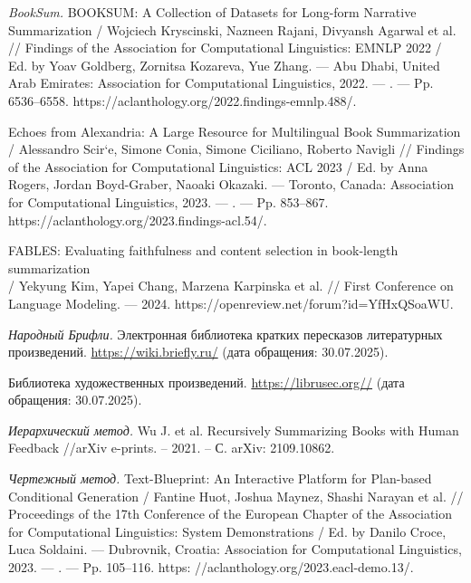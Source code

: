 \documentclass{article}
\begin{document}
\renewcommand\refname{References}


\begin{thebibliography}{99}
\textit{BookSum.}  
BOOKSUM: A Collection of Datasets for Long-form Narrative Summarization / Wojciech Kryscinski, Nazneen Rajani, Divyansh Agarwal et al. // Findings of the Association for Computational Linguistics: EMNLP 2022 / Ed. by Yoav Goldberg, Zornitsa Kozareva, Yue Zhang. — Abu Dhabi, United Arab Emirates: Association for Computational Linguistics, 2022. — . — Pp. 6536–6558. https://aclanthology.org/2022.findings-emnlp.488/.

Echoes from Alexandria: A Large Resource for Multilingual Book Summarization / Alessandro Scir`e, Simone Conia, Simone Ciciliano, Roberto Navigli // Findings of the Association for Computational Linguistics: ACL 2023 / Ed. by Anna Rogers, Jordan Boyd-Graber, Naoaki Okazaki. — Toronto, Canada: Association for Computational Linguistics, 2023. — . — Pp. 853–867. https://aclanthology.org/2023.findings-acl.54/.

FABLES: Evaluating faithfulness and content selection in book-length summarization \\/ Yekyung Kim, Yapei Chang, Marzena Karpinska et al. // First Conference on Language Modeling. — 2024. https://openreview.net/forum?id=YfHxQSoaWU.

\textit{Народный Брифли.}  
Электронная библиотека кратких пересказов литературных произведений.  
\url{https://wiki.briefly.ru/} (дата обращения: 30.07.2025).

Библиотека художественных произведений.  
\url{https://librusec.org//} (дата обращения: 30.07.2025).

\textit{Иерархический метод.}  
Wu J. et al. Recursively Summarizing Books with Human Feedback //arXiv e-prints. – 2021. – С. arXiv: 2109.10862.

\textit{Чертежный метод.}  
Text-Blueprint: An Interactive Platform for Plan-based Conditional Generation / Fantine Huot, Joshua Maynez, Shashi Narayan et al. // Proceedings of the 17th Conference of the European Chapter of the Association for Computational Linguistics:
System Demonstrations / Ed. by Danilo Croce, Luca Soldaini. — Dubrovnik, Croatia: Association for Computational Linguistics, 2023. — . — Pp. 105–116. https:
//aclanthology.org/2023.eacl-demo.13/.

\end{thebibliography}
\end{document}
